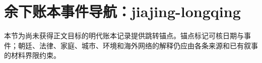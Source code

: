 \section{余下账本事件导航：jiajing-longqing}

\label{sec:remaining-event-anchors-jiajing-longqing}

本节为尚未获得正文目标的明代账本记录提供跳转锚点。锚点标记可核日期与事件；朝廷、法律、家庭、城市、环境和海外网络的解释仍应由各条来源和已有叙事的材料界限约束。
